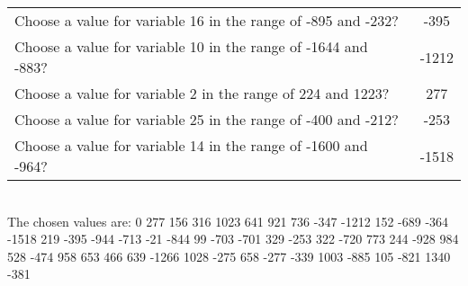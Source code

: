 \documentclass[10pt,a4paper]{article}
\begin{document}
\begin{appendix}
\begin{tabular}{ l  c }
\\Choose a value for variable 16 in the range of -895 and -232? & -395
\\Choose a value for variable 10 in the range of -1644 and -883? & -1212
\\Choose a value for variable 2 in the range of 224 and 1223? & 277
\\Choose a value for variable 25 in the range of -400 and -212? & -253
\\Choose a value for variable 14 in the range of -1600 and -964? & -1518
\end{tabular}
\\ \phantom{i} The chosen values are: 0   277   156   316  1023   641   921   736  -347 -1212   152  -689  -364 -1518   219  -395  -944  -713   -21  -844    99  -703  -701   329  -253   322  -720   773   244  -928   984   528  -474   958   653   466   639 -1266  1028  -275   658  -277  -339  1003  -885   105  -821  1340  -381
\end{appendix}
\end{document}
